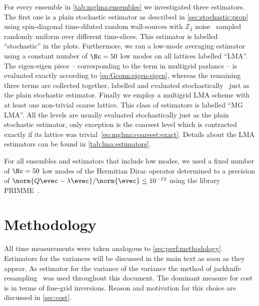For every ensemble in \cref{tab:mglma:ensembles} we investigated three estimators.
The first one is a plain stochastic estimator as described in \cref{sec:stochastic:prop} using spin-diagonal time-diluted random wall-sources with $\mathbb{Z}_2$ noise~\cite{ETM:2008zte} sampled randomly uniform over different time-slices.
This estimator is labelled ``stochastic'' in the plots.
Furthermore, we ran a low-mode averaging estimator using a constant number of $\Nc=50$ low modes on all lattices labelled ``LMA''.
The eigen-eigen piece -- corresponding to the  term in multigrid parlance -- is evaluated exactly according to \cref{eq:Gconn:eigen-eigen}, whereas the remaining three terms are collected together, labelled  and evaluated stochastically~\cite{lynch2023} just as the plain stochastic estimator.
Finally we employ a multigrid LMA scheme with at least one non-trivial coarse lattice.
This class of estimators is labelled ``MG LMA''.
All the levels are usually evaluated stochastically just as the plain stochastic estimator, only exception is the coarsest level which is contracted exactly if its lattice was trivial~\cref{eq:mglma:coarsest:exact}.
Details about the LMA estimators can be found in \cref{tab:lma:estimators}.

For all ensembles and estimators that include low modes, we used a fixed number of $\Nc=50$ low modes of the Hermitian Dirac operator determined to a precision of $\norm{Q \evec - \lambda \evec} / \norm{\evec} \leq 10^{-12}$ using the library PRIMME~\cite{primme}.

\section{Methodology}
\label{sec:numerics:methodology}


All time measurements were taken analogous to \cref{sec:perf:methodology}.
Estimators for the variances will be discussed in the main text as soon as they appear.
As estimator for the variance of the variance the method of jackknife resampling~\cite{efron1982jackknife,shao2012jackknife} was used throughout this document.
The dominant measure for cost is in terms of fine-grid inversions.
Reason and motivation for this choice are discussed in \cref{sec:cost}.

